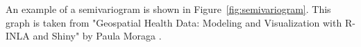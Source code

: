 An example of a semivariogram is shown in Figure~\ref{fig:semivariogram}. This graph is taken from "Geospatial Health Data: Modeling and Visualization with R-INLA and Shiny" by Paula Moraga \autocite[][]{moraga2019geospatial}. 
